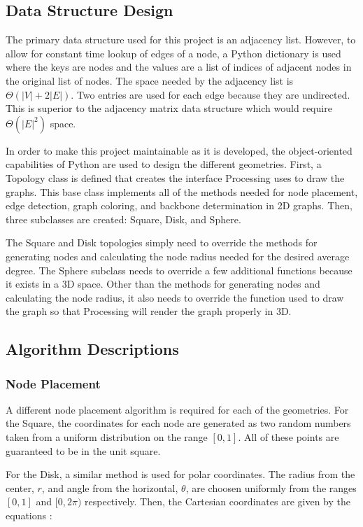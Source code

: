 \documentclass{article}
\begin{document}
    \subsection{Data Structure Design}
    The primary data structure used for this project is an adjacency list. However, to allow for constant time lookup of edges of a node, a Python dictionary is used where the keys are nodes and the values are a list of indices of adjacent nodes in the original list of nodes. The space needed by the adjacency list is $\Theta(|V| + 2|E|)$. Two entries are used for each edge because they are undirected. This is superior to the adjacency matrix data structure which would require $\Theta(|E|^2)$ space.
    \par
    In order to make this project maintainable as it is developed, the object-oriented capabilities of Python are used to design the different geometries. First, a Topology class is defined that creates the interface Processing uses to draw the graphs. This base class implements all of the methods needed for node placement, edge detection, graph coloring, and backbone determination in 2D graphs. Then, three subclasses are created: Square, Disk, and Sphere.
    \par
    The Square and Disk topologies simply need to override the methods for generating nodes and calculating the node radius needed for the desired average degree. The Sphere subclass needs to override a few additional functions because it exists in a 3D space. Other than the methods for generating nodes and calculating the node radius, it also needs to override the function used to draw the graph so that Processing will render the graph properly in 3D.

    \subsection{Algorithm Descriptions}

        \subsubsection{Node Placement}
        A different node placement algorithm is required for each of the geometries. For the Square, the coordinates for each node are generated as two random numbers taken from a uniform distribution on the range $[0,1]$. All of these points are guaranteed to be in the unit square.
        \par
        For the Disk, a similar method is used for polar coordinates. The radius from the center, $r$, and angle from the horizontal, $\theta$, are choosen uniformly from the ranges $[0,1]$ and $[0,2\pi)$ respectively. Then, the Cartesian coordinates are given by the equations \cite{diskpoints}:
\end{document}
